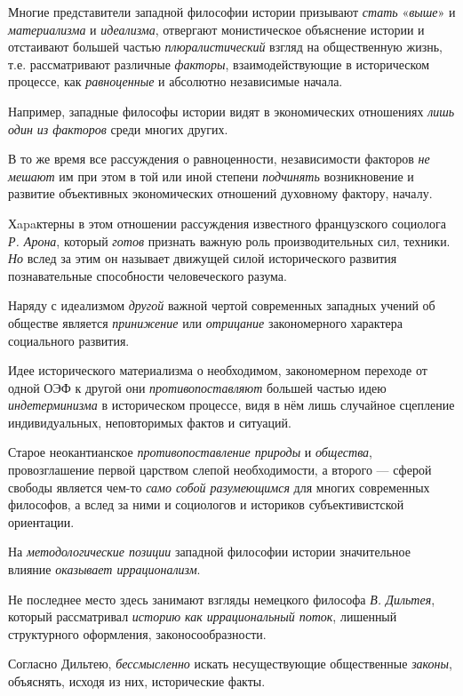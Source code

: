 \documentclass[a4paper,14pt,russian]{extreport}
\begin{document}
Многие представители западной философии истории призывают \emph{стать} «\emph{выше}» и \emph{материализма} и \emph{идеализма}, отвергают монистическое объяснение истории и отстаивают большей частью \emph{плюралистический} взгляд на общественную жизнь, т.е. рассматривают различные \emph{факторы}, взаимодействующие в историческом процессе, как \emph{равноценные} и абсолютно независимые начала.

Например, западные философы истории видят в экономических отношениях \emph{лишь один из факторов} среди многих других.

В то же время все рассуждения о равноценности, независимости факторов \emph{не мешают} им при этом в той или иной степени \emph{подчинять} возникновение и развитие объективных экономических отношений духовному фактору, началу.

Хapaктерны в этом отношении рассуждения известного французского социолога \emph{Р. Арона}, который \emph{готов} признать важную роль производительных сил, техники. \emph{Но} вслед за этим он называет движущей силой исторического развития познавательные способности человеческого разума.

Наряду с идеализмом \emph{другой} важной чертой современных западных учений об обществе является \emph{принижение} или \emph{отрицание} закономерного характера социального развития.

Идее исторического материализма о необходимом, закономерном переходе от одной ОЭФ к другой они \emph{противопоставляют} большей частью идею \emph{индетерминизма} в историческом процессе, видя в нём лишь случайное сцепление индивидуальных, неповторимых фактов и ситуаций.

Старое неокантианское \emph{противопоставление природы} и \emph{общества}, провозглашение первой царством слепой необходимости, а второго --- сферой свободы является чем-то \emph{само собой разумеющимся} для многих современных философов, а вслед за ними и социологов и историков субъективистской ориентации.

На \emph{методологические позиции} западной философии истории значительное влияние \emph{оказывает иррационализм}.

Не последнее место здесь занимают взгляды немецкого философа \emph{В. Дильтея}, который рассматривал \emph{историю как иррациональный поток}, лишенный структурного оформления, законосообразности.

Согласно Дильтею, \emph{бессмысленно} искать несуществующие общественные \emph{законы}, объяснять, исходя из них, исторические факты.
\end{document}
